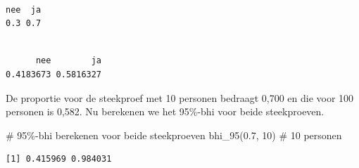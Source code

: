 \documentclass[
  letterpaper,
  DIV=11,
  numbers=noendperiod]{scrreprt}
\newenvironment{Shaded}{\begin{snugshade}}{\end{snugshade}}
\newcommand{\AttributeTok}[1]{\textcolor[rgb]{0.40,0.45,0.13}{#1}}
\newcommand{\CommentTok}[1]{\textcolor[rgb]{0.37,0.37,0.37}{#1}}
\newcommand{\DecValTok}[1]{\textcolor[rgb]{0.68,0.00,0.00}{#1}}
\newcommand{\FloatTok}[1]{\textcolor[rgb]{0.68,0.00,0.00}{#1}}
\newcommand{\FunctionTok}[1]{\textcolor[rgb]{0.28,0.35,0.67}{#1}}
\newcommand{\NormalTok}[1]{\textcolor[rgb]{0.00,0.23,0.31}{#1}}
\newcommand{\OtherTok}[1]{\textcolor[rgb]{0.00,0.23,0.31}{#1}}
\newcommand{\SpecialCharTok}[1]{\textcolor[rgb]{0.37,0.37,0.37}{#1}}
\begin{document}
\begin{Shaded}
\end{Shaded}

\begin{verbatim}

nee  ja 
0.3 0.7 
\end{verbatim}

\begin{Shaded}
\end{Shaded}

\begin{verbatim}

      nee        ja 
0.4183673 0.5816327 
\end{verbatim}

De proportie voor de steekproef met 10 personen bedraagt 0,700 en die
voor 100 personen is 0,582. Nu berekenen we het 95\%-bhi voor beide
steekproeven.

\begin{Shaded}
\begin{Highlighting}[]
\CommentTok{\# 95\%{-}bhi berekenen voor beide steekproeven}
\FunctionTok{bhi\_95}\NormalTok{(}\FloatTok{0.7}\NormalTok{, }\DecValTok{10}\NormalTok{) }\CommentTok{\# 10 personen}
\end{Highlighting}
\end{Shaded}

\begin{verbatim}
[1] 0.415969 0.984031
\end{verbatim}
\end{document}
